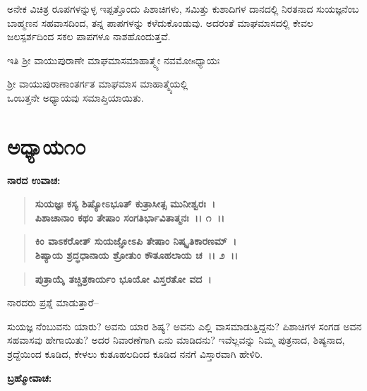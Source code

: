 ಅನೇಕ ವಿಚಿತ್ರ ರೂಪಗಳನ್ನುಳ್ಳ ಇಪ್ಪತ್ತೊಂದು ಪಿಶಾಚಿಗಳು, ಸಮಿತ್ತು ಕುಶಾದಿಗಳ ದಾನದಲ್ಲಿ ನಿರತನಾದ ಸುಯಜ್ಞನೆಂಬ ಬಾಹ್ಮಣನ ಸಹವಾಸದಿಂದ, ತನ್ನ ಪಾಪಗಳನ್ನು ಕಳೆದುಕೊಂಡುವು. ಅದರಂತೆ ಮಾಘಮಾಸದಲ್ಲಿ ಕೇವಲ ಜಲಸ್ಪರ್ಶದಿಂದ ಸಕಲ ಪಾಪಗಳೂ ನಾಶಹೊಂದುತ್ತವೆ.

\begin{center}
ಇತಿ ಶ‍್ರೀ ವಾಯುಪುರಾಣೇ ಮಾಘಮಾಸಮಾಹಾತ್ಮ್ಯೇ ನವಮೋsಧ್ಯಾಯಃ 
\end{center}

\begin{center}
ಶ‍್ರೀ ವಾಯುಪುರಾಣಾಂತರ್ಗತ ಮಾಘಮಾಸ ಮಾಹಾತ್ಮ್ಯೆಯಲ್ಲಿ \\ ಒಂಬತ್ತನೇ ಅಧ್ಯಾಯವು ಸಮಾಪ್ತಿಯಾಯಿತು.
\end{center}

\newpage

\section*{ಅಧ್ಯಾಯ೧೦}

\emptypage

\begin{flushleft}
\textbf{ನಾರದ ಉವಾಚ: }
\end{flushleft}

\begin{verse}
\textbf{ಸುಯಜ್ಞಃ ಕಸ್ಯ ಶಿಷ್ಯೋಽಭೂತ್ ಕುತ್ರಾಸೀತ್ಸ ಮುನೀಶ್ವರಃ~।}\\\textbf{ಪಿಶಾಚಾನಾಂ ಕಥಂ ತೇಷಾಂ ಸಂಗತಿರ್ಭಾವಿತಾತ್ಮನಃ~।। ೧~।। }
\end{verse}

\begin{verse}
\textbf{ಕಿಂ ವಾಽಕರೋತ್ ಸುಯಜ್ಞೋಽಪಿ ತೇಷಾಂ ನಿಷ್ಕೃತಿಕಾರಣಮ್~।}\\\textbf{ಶಿಷ್ಯಾಯ ಶ್ರದ್ಧಧಾನಾಯ ಶ್ರೋತುಂ ಕೌತೂಹಲಾಯ ಚ~।। ೨~।।}
\end{verse}

\begin{verse}
\textbf{ಪುತ್ರಾಯೈ ತಚ್ಚಿತ್ರಕಾರ್ಯಂ ಭೂಯೋ ವಿಸ್ತರತೋ ವದ~।}
\end{verse}

\begin{flushleft}
ನಾರದರು ಪ್ರಶ್ನೆ ಮಾಡುತ್ತಾರೆ–
\end{flushleft}

ಸುಯಜ್ಞ ನೆಂಬುವನು ಯಾರು? ಅವನು ಯಾರ ಶಿಷ್ಯ? ಅವನು ಎಲ್ಲಿ ವಾಸಮಾಡುತ್ತಿದ್ದನು? ಪಿಶಾಚಿಗಳ ಸಂಗಡ ಅವನ ಸಹವಾಸವು ಹೇಗಾಯಿತು? ಅದರ ನಿವಾರಣೆಗಾಗಿ ಏನು ಮಾಡಿದನು? ಇವೆಲ್ಲವನ್ನು ನಿಮ್ಮ ಪುತ್ರನಾದ, ಶಿಷ್ಯನಾದ, ಶ್ರದ್ದೆಯಿಂದ ಕೂಡಿದ, ಕೇಳಲು ಕುತೂಹಲದಿಂದ ಕೂಡಿದ ನನಗೆ ವಿಸ್ತಾರವಾಗಿ ಹೇಳಿರಿ.

\begin{flushleft}
\textbf{ಬ್ರಹ್ಮೋವಾಚ:}
\end{flushleft}

